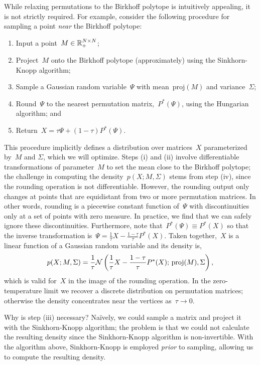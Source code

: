 \documentclass[twoside]{article}
\begin{document}
While relaxing permutations to the Birkhoff polytope is intuitively
appealing, it is not strictly required.  For example, consider the
following procedure for sampling a point \emph{near} the Birkhoff
polytope:
\begin{enumerate}[label=(\roman*)]
\item Input a point~${M \in \mathbb{R}_+^{N \times N}}$;
\item Project~$M$ onto the Birkhoff polytope (approximately) using the Sinkhorn-Knopp algorithm;
\item Sample a Gaussian random variable~$\Psi$ with mean~$\mathrm{proj}(M)$ and variance~$\Sigma$;
\item Round~$\Psi$ to the nearest permutation matrix,~${P^*(\Psi)}$, using the Hungarian algorithm;
  and
\item Return~${X = \tau \Psi + (1-\tau) P^*(\Psi)}$.
\end{enumerate}
This procedure implicitly defines a distribution over matrices~$X$
parameterized by~$M$ and $\Sigma$, which we will optimize.
Steps (i) and (ii) involve differentiable transformations of
parameter~$M$ to set the mean close to the Birkhoff polytope; the
challenge in computing the density~$p(X; M, \Sigma)$ stems from step
(iv), since the rounding operation is not differentiable.  However,
the rounding output only changes at points that are equidistant from
two or more permutation matrices. In other words, rounding is a
piecewise constant function of~$\Psi$ with discontinuities only at a
set of points with zero measure. In practice, we find that we can
safely ignore these discontinuities.  Furthermore, note
that~${P^*(\Psi) \equiv P^*(X)}$ so that the inverse transformation
is~${\Psi = \tfrac{1}{\tau}X - \tfrac{1-\tau}{\tau} P^*(X)}$.  Taken
together,~$X$ is a linear function of a Gaussian random variable and
its density is,
\begin{align*}
  p(X; M, \Sigma) = \frac{1}{\tau} \mathcal{N} \left( \frac{1}{\tau}X -\frac{1-\tau}{\tau} P^*(X); \, \mathrm{proj}(M), \Sigma \right),
\end{align*}
which is valid for~$X$ in the image of the rounding operation.  In the
zero-temperature limit we recover a discrete distribution on
permutation matrices; otherwise the density concentrates near the
vertices as~${\tau \to 0}$.

Why is step (iii) necessary? Na\"ively, we could sample a matrix and
project it with the Sinkhorn-Knopp algorithm; the problem is that we
could not calculate the resulting density since the Sinkhorn-Knopp
algorithm is non-invertible.  With the algorithm above, Sinkhorn-Knopp
is employed \emph{prior} to sampling, allowing us to compute the
resulting density.
\end{document}
